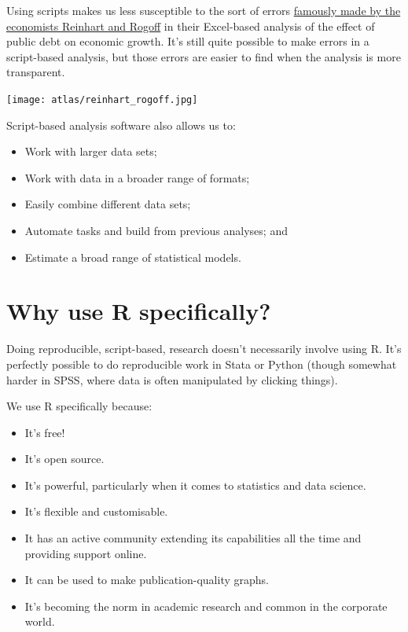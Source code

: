 \documentclass[
]{book}
\providecommand{\tightlist}{%
  \setlength{\itemsep}{0pt}\setlength{\parskip}{0pt}}
\begin{document}
Using scripts makes us less susceptible to the sort of errors \href{https://en.wikipedia.org/wiki/Growth_in_a_Time_of_Debt\#Methodological_flaws}{famously made by the economists Reinhart and Rogoff} in their Excel-based analysis of the effect of public debt on economic growth. It's still quite possible to make errors in a script-based analysis, but those errors are easier to find when the analysis is more transparent.

\texttt{[image: atlas/reinhart\_rogoff.jpg]}

Script-based analysis software also allows us to:

\begin{itemize}
\tightlist
\item
  Work with larger data sets;
\item
  Work with data in a broader range of formats;
\item
  Easily combine different data sets;
\item
  Automate tasks and build from previous analyses; and
\item
  Estimate a broad range of statistical models.
\end{itemize}

\hypertarget{why-R}{%
\section{Why use R specifically?}\label{why-R}}

Doing reproducible, script-based, research doesn't necessarily involve using R. It's perfectly possible to do reproducible work in Stata or Python (though somewhat harder in SPSS, where data is often manipulated by clicking things).

We use R specifically because:

\begin{itemize}
\tightlist
\item
  It's free!
\item
  It's open source.
\item
  It's powerful, particularly when it comes to statistics and data science.
\item
  It's flexible and customisable.
\item
  It has an active community extending its capabilities all the time and providing support online.
\item
  It can be used to make publication-quality graphs.
\item
  It's becoming the norm in academic research and common in the corporate world.
\end{itemize}
\end{document}
